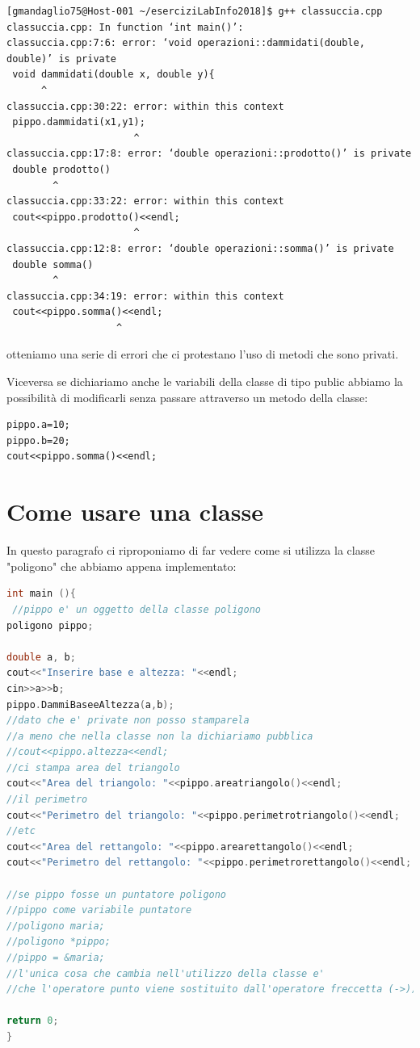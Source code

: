 \documentclass[11pt,fleqn]{book} %
\begin{document}
\begin{verbatim}
[gmandaglio75@Host-001 ~/eserciziLabInfo2018]$ g++ classuccia.cpp
classuccia.cpp: In function ‘int main()’:
classuccia.cpp:7:6: error: ‘void operazioni::dammidati(double, double)’ is private
 void dammidati(double x, double y){
      ^
classuccia.cpp:30:22: error: within this context
 pippo.dammidati(x1,y1);
                      ^
classuccia.cpp:17:8: error: ‘double operazioni::prodotto()’ is private
 double prodotto()
        ^
classuccia.cpp:33:22: error: within this context
 cout<<pippo.prodotto()<<endl;
                      ^
classuccia.cpp:12:8: error: ‘double operazioni::somma()’ is private
 double somma()
        ^
classuccia.cpp:34:19: error: within this context
 cout<<pippo.somma()<<endl;
                   ^

\end{verbatim}

otteniamo una serie di errori che ci protestano l'uso di metodi che sono privati.

Viceversa se dichiariamo anche le variabili della classe di tipo public abbiamo la possibilità di modificarli 
senza passare attraverso un metodo della classe:
\begin{verbatim}
pippo.a=10;
pippo.b=20;
cout<<pippo.somma()<<endl;
\end{verbatim}



 
 \section{Come usare una classe}
 In questo paragrafo ci riproponiamo di far vedere come si utilizza la classe "poligono" che abbiamo appena implementato:

\begin{lstlisting}[language=c++]
 int main (){
 //pippo e' un oggetto della classe poligono
poligono pippo;

double a, b;
cout<<"Inserire base e altezza: "<<endl;
cin>>a>>b;
pippo.DammiBaseeAltezza(a,b);
//dato che e' private non posso stamparela
//a meno che nella classe non la dichiariamo pubblica
//cout<<pippo.altezza<<endl;  
//ci stampa area del triangolo
cout<<"Area del triangolo: "<<pippo.areatriangolo()<<endl;
//il perimetro		
cout<<"Perimetro del triangolo: "<<pippo.perimetrotriangolo()<<endl;
//etc
cout<<"Area del rettangolo: "<<pippo.arearettangolo()<<endl;
cout<<"Perimetro del rettangolo: "<<pippo.perimetrorettangolo()<<endl;

//se pippo fosse un puntatore poligono 
//pippo come variabile puntatore
//poligono maria;
//poligono *pippo;
//pippo = &maria;
//l'unica cosa che cambia nell'utilizzo della classe e'
//che l'operatore punto viene sostituito dall'operatore freccetta (->))

return 0;
}
\end{lstlisting}  
\end{document}
